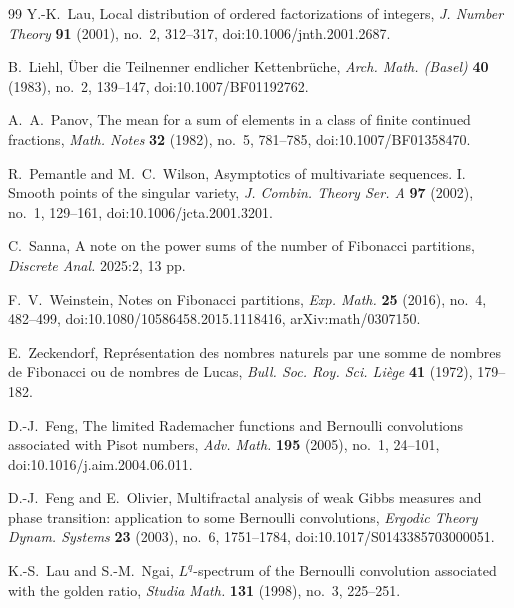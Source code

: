 \begin{thebibliography}{99}
Y.-K.~Lau,
Local distribution of ordered factorizations of integers,
\textit{J. Number Theory} \textbf{91} (2001), no.~2, 312--317,
doi:10.1006/jnth.2001.2687.

B.~Liehl,
\"Uber die Teilnenner endlicher Kettenbr\"uche,
\textit{Arch. Math. (Basel)} \textbf{40} (1983), no.~2, 139--147,
doi:10.1007/BF01192762.

A.~A.~Panov,
The mean for a sum of elements in a class of finite continued fractions,
\textit{Math. Notes} \textbf{32} (1982), no.~5, 781--785,
doi:10.1007/BF01358470.

R.~Pemantle and M.~C.~Wilson,
Asymptotics of multivariate sequences. I. Smooth points of the singular
variety,
\textit{J. Combin. Theory Ser. A} \textbf{97} (2002), no.~1, 129--161,
doi:10.1006/jcta.2001.3201.

C.~Sanna,
A note on the power sums of the number of Fibonacci partitions,
\textit{Discrete Anal.} 2025:2, 13 pp.

F.~V.~Weinstein,
Notes on Fibonacci partitions,
\textit{Exp. Math.} \textbf{25} (2016), no.~4, 482--499,
doi:10.1080/10586458.2015.1118416, arXiv:math/0307150.

E.~Zeckendorf,
Repr\'esentation des nombres naturels par une somme de nombres de Fibonacci ou
de nombres de Lucas,
\textit{Bull. Soc. Roy. Sci. Li\`ege} \textbf{41} (1972), 179--182.

D.-J.~Feng,
The limited Rademacher functions and Bernoulli convolutions associated with
Pisot numbers,
\textit{Adv. Math.} \textbf{195} (2005), no.~1, 24--101,
doi:10.1016/j.aim.2004.06.011.

D.-J.~Feng and E.~Olivier,
Multifractal analysis of weak Gibbs measures and phase transition:
application to some Bernoulli convolutions,
\textit{Ergodic Theory Dynam. Systems} \textbf{23} (2003), no.~6,
1751--1784, doi:10.1017/S0143385703000051.

K.-S.~Lau and S.-M.~Ngai,
\(L^q\)-spectrum of the Bernoulli convolution associated with the golden
ratio,
\textit{Studia Math.} \textbf{131} (1998), no.~3, 225--251.

\end{thebibliography}
